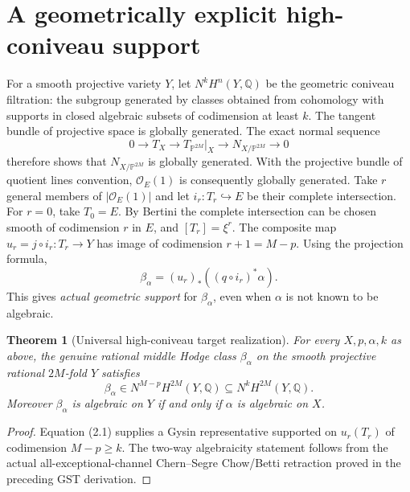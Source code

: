 \documentclass[11pt]{article}
\newcommand{\Q}{\mathbb Q}
\newtheorem{theorem}{Theorem}[section]
\begin{document}
\section{A geometrically explicit high-coniveau support}
For a smooth projective variety \(Y\), let
\(N^kH^n(Y,\Q)\) be the geometric coniveau filtration:
the subgroup generated by classes obtained from
cohomology with supports in closed algebraic
subsets of codimension at least \(k\).
The tangent bundle of projective space is globally
generated. The exact normal sequence
\[
 0\to T_X\to T_{\mathbb P^{2M}}|_X
   \to N_{X/\mathbb P^{2M}}\to0
\]
therefore shows that \(N_{X/\mathbb P^{2M}}\)
is globally generated. With the projective bundle
of quotient lines convention, \(\mathcal O_E(1)\)
is consequently globally generated.
Take \(r\) general members of
\(|\mathcal O_E(1)|\) and let
\(i_r:T_r\hookrightarrow E\) be their complete intersection.
For \(r=0\), take \(T_0=E\).
By Bertini the complete intersection can be chosen
smooth of codimension \(r\) in \(E\), and
\([T_r]=\xi^r\). The composite map
\(u_r=j\circ i_r:T_r\to Y\) has image of
codimension \(r+1=M-p\).
Using the projection formula,
\[
 \boxed{\beta_\alpha=
   (u_r)_*((q\circ i_r)^*\alpha).} \tag{2.1}
\]
This gives \emph{actual geometric support} for
\(\beta_\alpha\), even when \(\alpha\) is not known
to be algebraic.

\begin{theorem}[Universal high-coniveau target realization]
For every \(X,p,\alpha,k\) as above, the genuine rational
middle Hodge class \(\beta_\alpha\) on the smooth
projective rational \(2M\)-fold \(Y\) satisfies
\[
 \beta_\alpha\in N^{M-p}H^{2M}(Y,\Q)
    \subseteq N^kH^{2M}(Y,\Q).
 \tag{2.2}
\]
Moreover \(\beta_\alpha\) is algebraic on \(Y\)
if and only if \(\alpha\) is algebraic on \(X\).
\end{theorem}
\begin{proof}
Equation (2.1) supplies a Gysin representative supported
on \(u_r(T_r)\) of codimension \(M-p\ge k\).
The two-way algebraicity statement follows from the
actual all-exceptional-channel Chern--Segre Chow/Betti
retraction proved in the preceding GST derivation.
\end{proof}
\end{document}

